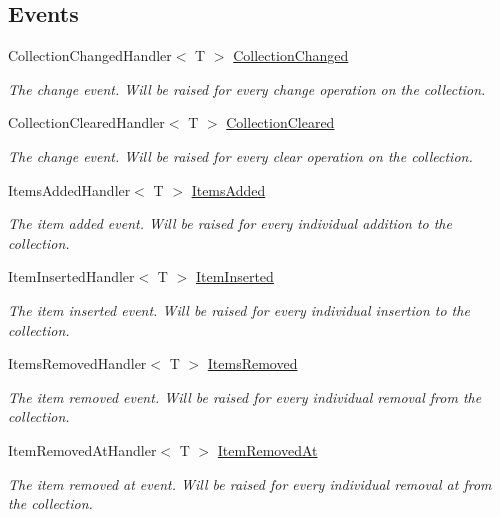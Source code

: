 \subsection*{Events}
\begin{DoxyCompactItemize}
\item 
Collection\+Changed\+Handler$<$ T $>$ \hyperlink{interface_c5_1_1_i_collection_value_a50d218d2c7a194c1a641e14d167b7412}{Collection\+Changed}
\begin{DoxyCompactList}\small\item\em The change event. Will be raised for every change operation on the collection. \end{DoxyCompactList}\item 
Collection\+Cleared\+Handler$<$ T $>$ \hyperlink{interface_c5_1_1_i_collection_value_abfc456208223df571826f444d368f851}{Collection\+Cleared}
\begin{DoxyCompactList}\small\item\em The change event. Will be raised for every clear operation on the collection. \end{DoxyCompactList}\item 
Items\+Added\+Handler$<$ T $>$ \hyperlink{interface_c5_1_1_i_collection_value_a22cf109895d493a5627162f7b5c4041b}{Items\+Added}
\begin{DoxyCompactList}\small\item\em The item added event. Will be raised for every individual addition to the collection. \end{DoxyCompactList}\item 
Item\+Inserted\+Handler$<$ T $>$ \hyperlink{interface_c5_1_1_i_collection_value_a2677a887fe66bbb35811797a04ba9a46}{Item\+Inserted}
\begin{DoxyCompactList}\small\item\em The item inserted event. Will be raised for every individual insertion to the collection. \end{DoxyCompactList}\item 
Items\+Removed\+Handler$<$ T $>$ \hyperlink{interface_c5_1_1_i_collection_value_a5c228bd1f7d517ff48ab6dfc19965c25}{Items\+Removed}
\begin{DoxyCompactList}\small\item\em The item removed event. Will be raised for every individual removal from the collection. \end{DoxyCompactList}\item 
Item\+Removed\+At\+Handler$<$ T $>$ \hyperlink{interface_c5_1_1_i_collection_value_aeb3b4f97b700058c5196d7a8d1241ede}{Item\+Removed\+At}
\begin{DoxyCompactList}\small\item\em The item removed at event. Will be raised for every individual removal at from the collection. \end{DoxyCompactList}\end{DoxyCompactItemize}


